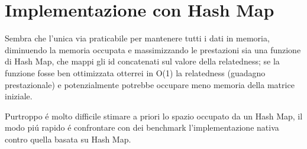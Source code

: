 \section{Implementazione con Hash Map}
Sembra che l'unica via praticabile per mantenere tutti i dati in memoria, diminuendo la memoria occupata e massimizzando le prestazioni sia una funzione di Hash Map, 
che mappi gli id concatenati sul valore della relatedness; se la funzione fosse ben ottimizzata otterrei in O(1) la relatedness (guadagno prestazionale)
e potenzialmente potrebbe occupare meno memoria della matrice iniziale.

Purtroppo \'e molto difficile stimare a priori lo spazio occupato da un Hash Map, 
il modo pi\'u rapido \'e confrontare con dei benchmark l'implementazione nativa contro quella basata su Hash Map.

